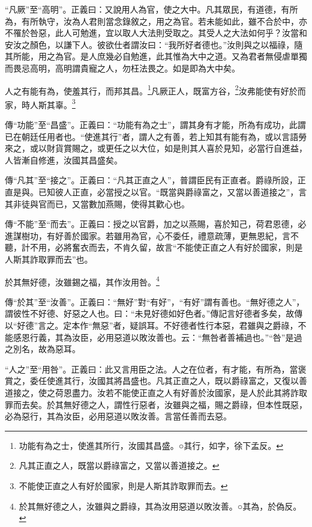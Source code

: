 {\noindent\shu{}\fzkt “凡厥”至“高明”。正義曰：又說用人為官，使之大中。凡其眾民，有道德，有所為，有所執守，汝為人君則當念錄敘之，用之為官。若未能如此，雖不合於中，亦不罹於咎惡，此人可勉進，宜以取人大法則受取之。其受人之大法如何乎？汝當和安汝之顏色，以謙下人。彼欲仕者謂汝曰：“我所好者德也。”汝則與之以福祿，隨其所能，用之為官。是人庶幾必自勉進，此其惟為大中之道。又為君者無侵虐單獨而畏忌高明，高明謂貴寵之人，勿枉法畏之。如是即為大中矣。 \par}

人之有能有為，使羞其行，而邦其昌。\footnote{功能有為之士，使進其所行，汝國其昌盛。○其行，如字，徐下孟反。}凡厥正人，既富方谷，\footnote{凡其正直之人，既當以爵祿富之，又當以善道接之。}汝弗能使有好於而家，時人斯其辜。\footnote{不能使正直之人有好於國家，則是人斯其詐取罪而去。}


{\noindent\zhuan{}\fzbyks 傳“功能”至“昌盛”。正義曰：“功能有為之士”，謂其身有才能，所為有成功，此謂已在朝廷任用者也。“使進其行”者，謂人之有善，若上知其有能有為，或以言語勞來之，或以財貨賞賜之，或更任之以大位，如是則其人喜於見知，必當行自進益，人皆漸自修進，汝國其昌盛矣。 \par}

{\noindent\zhuan{}\fzbyks 傳“凡其”至“接之”。正義曰：“凡其正直之人”，普謂臣民有正直者。爵祿所設，正直是與。已知彼人正直，必當授之以官。“既當與爵祿富之，又當以善道接之”，言其非徒與官而已，又當數加燕賜，使得其歡心也。 \par}

{\noindent\zhuan{}\fzbyks 傳“不能”至“而去”。正義曰：授之以官爵，加之以燕賜，喜於知己，荷君恩德，必進謀樹功，有好善於國家。若雖用為官，心不委任，禮意疏薄，更無恩紀，言不聽，計不用，必將奮衣而去，不肯久留，故言“不能使正直之人有好於國家，則是人斯其詐取罪而去”也。 \par}

於其無好德，汝雖錫之福，其作汝用咎。\footnote{於其無好德之人，汝雖與之爵祿，其為汝用惡道以敗汝善。○其為，於偽反。}

{\noindent\zhuan{}\fzbyks 傳“於其”至“汝善”。正義曰：“無好”對“有好”，“有好”謂有善也。“無好德之人”，謂彼性不好德、好惡之人也。曰：“未見好德如好色者。”傳記言好德者多矣，故傳以“好德”言之。定本作“無惡”者，疑誤耳。不好德者性行本惡，君雖與之爵祿，不能感恩行義，其為汝臣，必用惡道以敗汝善也。云：“無咎者善補過也。”“咎”是過之別名，故為惡耳。 \par}

{\noindent\shu{}\fzkt “人之”至“用咎”。正義曰：此又言用臣之法。人之在位者，有才能，有所為，當褒賞之，委任使進其行，汝國其將昌盛也。凡其正直之人，既以爵祿富之，又復以善道接之，使之荷恩盡力。汝若不能使正直之人有好善於汝國家，是人於此其將詐取罪而去矣。於其無好德之人，謂性行惡者，汝雖與之福，賜之爵祿，但本性既惡，必為惡行，其為汝臣，必用惡道以敗汝善。言當任善而去惡。 \par}

